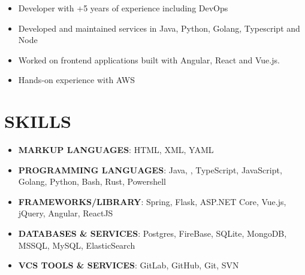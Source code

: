 \documentclass[10pt,a4paper,roman]{moderncv}
\begin{document}
{\begin{itemize}
\item  Developer with +5 years of experience including DevOps
\item Developed and maintained services in Java, Python, Golang, Typescript and Node
\item Worked on frontend applications built with Angular, React and Vue.js.
\item Hands-on experience with AWS

\end{itemize}
\vspace*{-2.5mm}

\section{SKILLS}
\vspace*{-5mm}


\begin{multicols}{2}
  \begin{itemize}
    \item \textbf{MARKUP LANGUAGES}: HTML, XML, YAML \\ \vspace*{-3.5mm}
    
    \item \textbf{PROGRAMMING LANGUAGES}: Java,
    , TypeScript, JavaScript, Golang, Python, Bash, Rust, Powershell \\ \vspace*{-3.5mm}
    \item \textbf{FRAMEWORKS/LIBRARY}: Spring, Flask, ASP.NET Core, Vue.js, jQuery, Angular, ReactJS \\ \vspace*{-3.5mm}
    \item \textbf{DATABASES \& SERVICES}: Postgres, FireBase, SQLite, MongoDB, MSSQL, MySQL, ElasticSearch \\ \vspace*{-3.5mm}                   
    \item \textbf{VCS TOOLS \& SERVICES}: GitLab, GitHub, Git, SVN \\ \vspace*{-3.5mm}
    

\end{itemize}
\end{multicols}}
\end{document}
